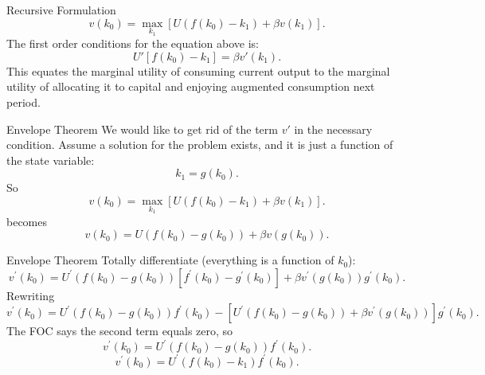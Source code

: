 \documentclass{beamer}
\begin{document}
\begin{frame}{Recursive Formulation}
 \[v(k_0)=\max_{k_1} \left[ U(f(k_0)-k_1)+\beta v(k_1)\right].
    \]
    The first order conditions for the equation above is:
    \[U'[f(k_0)-k_1]=\beta v'(k_1). 
    \]
    This equates the marginal utility of consuming current output to the marginal utility of allocating it to capital and enjoying augmented consumption next period.
\end{frame}

\begin{frame}{Envelope Theorem}
    We would like to get rid of the term $v'$ in the necessary condition. Assume a solution for the problem exists, and it is just a function of the state variable:
    \[k_1=g(k_0).
    \]
    So \[v(k_0)=\max_{k_1} \left[ U(f(k_0)-k_1)+\beta v(k_1)\right].
    \]
    becomes 
     \[v(k_0)= U(f(k_0)-g(k_0))+\beta v(g(k_0)).
    \]
    \end{frame}

\begin{frame}{Envelope Theorem}
Totally differentiate (everything is a function of $k_0$):
\[v^\prime (k_0)=U^\prime(f(k_0)-g(k_0))[f^\prime(k_0)-g^\prime(k_0)]+\beta v^\prime (g(k_0))g^\prime(k_0).
\]
Rewriting
\[v^\prime (k_0)=U^\prime(f(k_0)-g(k_0))f^\prime(k_0)-\left[U^\prime(f(k_0)-g(k_0))+\beta v^\prime (g(k_0))\right]g^\prime(k_0).
\]
The FOC says the second term equals zero, so
\[v^\prime (k_0)=U^\prime(f(k_0)-g(k_0))f^\prime(k_0).
\]
\[v^\prime (k_0)=U^\prime(f(k_0)-k_1)f^\prime(k_0).
\]
   \end{frame}
\end{document}
